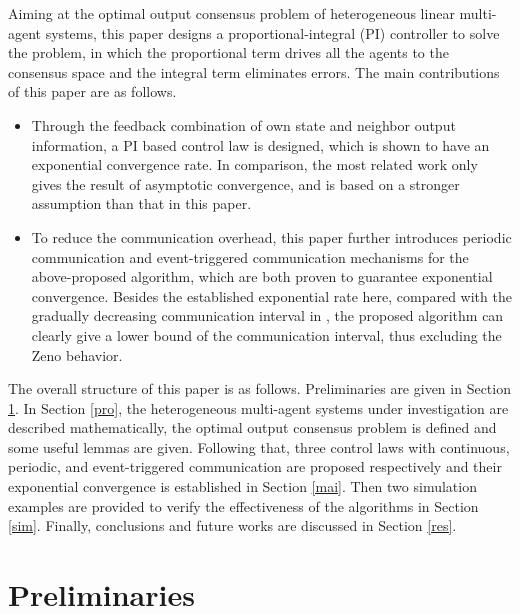 \documentclass[final,5p,times,twocolumn,authoryear]{elsarticle}
\begin{document}
Aiming at the optimal output consensus problem of heterogeneous linear multi-agent systems, this paper  designs a proportional-integral (PI) controller to solve the problem, in which the proportional term drives all the agents to the consensus space and the integral term eliminates errors\citep{qiu2019}. The main contributions of this paper are as follows.
\begin{itemize}	
	\item[1)] Through the feedback combination of own state and neighbor output information, a PI based control law is designed, which is shown to have an exponential convergence rate. In comparison, the most related work \citep{li2020} only gives the result of asymptotic convergence, and is based on a stronger assumption than that in this paper.
	
	\item[2)] To reduce the communication overhead, this paper further introduces periodic communication and event-triggered communication mechanisms for the above-proposed algorithm, which are both proven to guarantee exponential convergence. Besides the established exponential rate here, compared with the gradually decreasing communication interval in \citet{li2020}, the proposed algorithm can clearly give a lower bound of the communication interval, thus excluding the Zeno behavior. 
\end{itemize}


The overall structure of this paper is as follows. Preliminaries are given in Section \ref{pre}. In Section \ref{pro}, the heterogeneous multi-agent systems under investigation are described mathematically, the optimal output consensus problem is defined and some useful lemmas are given. Following that, three control laws with continuous, periodic, and event-triggered communication are proposed respectively and their exponential convergence is established in Section \ref{mai}. Then two simulation examples are provided to verify the effectiveness of the algorithms in Section \ref{sim}. Finally, conclusions and future works are discussed in Section \ref{res}.

\section{Preliminaries}\label{pre}
\end{document}
